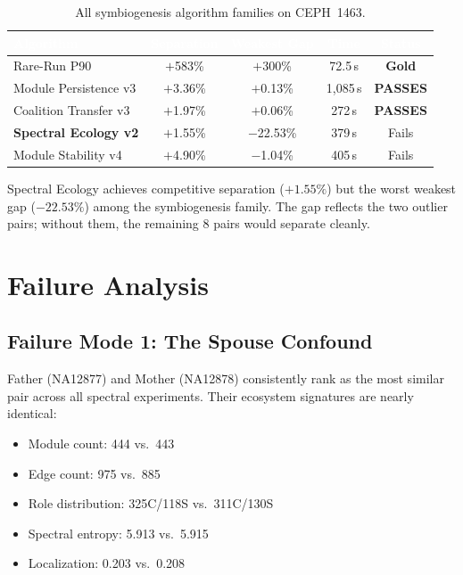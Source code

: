 \documentclass{../yalumba}
\begin{document}
\begin{table}[H]
  \centering
  \tablestyle
  \caption{All symbiogenesis algorithm families on CEPH~1463.}
  \label{tab:all-algorithms}
  \begin{tabular}{lcccc}
    \toprule
    \rowcolor{table-header}
    \textcolor{white}{\textbf{Algorithm}} &
    \textcolor{white}{\textbf{Separation}} &
    \textcolor{white}{\textbf{Weakest Gap}} &
    \textcolor{white}{\textbf{Time}} &
    \textcolor{white}{\textbf{Status}} \\
    \midrule
    Rare-Run P90
      & $+$583\% & $+$300\% & 72.5\,s & \textbf{Gold} \\
    Module Persistence v3
      & $+$3.36\% & $+$0.13\% & 1{,}085\,s & \textbf{PASSES} \\
    Coalition Transfer v3
      & $+$1.97\% & $+$0.06\% & 272\,s & \textbf{PASSES} \\
    \textbf{Spectral Ecology v2}
      & $+$1.55\% & $-$22.53\% & 379\,s & Fails \\
    Module Stability v4
      & $+$4.90\% & $-$1.04\% & 405\,s & Fails \\
    \bottomrule
  \end{tabular}
\end{table}

Spectral Ecology achieves competitive separation ($+1.55\%$) but the worst
weakest gap ($-22.53\%$) among the symbiogenesis family.  The gap reflects the
two outlier pairs; without them, the remaining 8 pairs would separate cleanly.


\section{Failure Analysis}
\label{sec:failure}

\subsection{Failure Mode 1: The Spouse Confound}

Father (NA12877) and Mother (NA12878) consistently rank as the most similar
pair across all spectral experiments.  Their ecosystem signatures are nearly
identical:

\begin{itemize}
  \item Module count: 444 vs.\ 443
  \item Edge count: 975 vs.\ 885
  \item Role distribution: 325C/118S vs.\ 311C/130S
  \item Spectral entropy: 5.913 vs.\ 5.915
  \item Localization: 0.203 vs.\ 0.208
\end{itemize}
\end{document}
